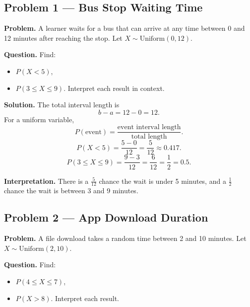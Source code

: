 



\begin{ExamProblems}

\item
\subsection*{Problem 1 — Bus Stop Waiting Time}

\textbf{Problem.}
A learner waits for a bus that can arrive at any time between 0 and 12 minutes after reaching the stop.
Let $X\sim \text{Uniform}(0,12)$.

\textbf{Question.}
Find:
\begin{itemize}
    \item[(a)] $P(X<5)$,
    \item[(b)] $P(3\le X\le 9)$.
Interpret each result in context.
\end{itemize}

\textbf{Solution.}
The total interval length is
\[
b-a=12-0=12.
\]
For a uniform variable,
\[
P(\text{event})=\frac{\text{event interval length}}{\text{total length}}.
\]
\[
P(X<5)=\frac{5-0}{12}=\frac{5}{12}\approx 0.417.
\]
\[
P(3\le X\le 9)=\frac{9-3}{12}=\frac{6}{12}=\frac{1}{2}=0.5.
\]

\textbf{Interpretation.}
There is a $\frac{5}{12}$ chance the wait is under 5 minutes, and a $\frac{1}{2}$ chance the wait is between 3 and 9 minutes.


\item
\subsection*{Problem 2 — App Download Duration}

\textbf{Problem.}
A file download takes a random time between 2 and 10 minutes.
Let $X\sim \text{Uniform}(2,10)$.

\textbf{Question.}
Find:
\begin{itemize}
    \item[(a)] $P(4\le X\le 7)$,
    \item[(b)] $P(X>8)$.
Interpret each result.
\end{itemize}


\end{ExamProblems}
